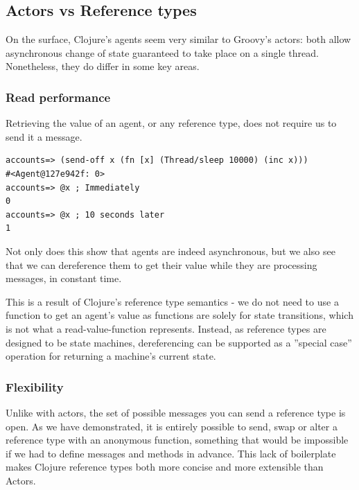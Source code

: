 \documentclass[a4paper,12pt]{kth-mag}
\begin{document}
\subsection{Actors vs Reference types}

On the surface, Clojure's agents seem very similar to Groovy's actors: both allow asynchronous change of state guaranteed to take place on a single thread. Nonetheless, they do differ in some key areas.

\subsubsection{Read performance}

Retrieving the value of an agent, or any reference type, does not require us to send it a message. 

\begin{listing}[H]
	\begin{verbatim}
accounts=> (send-off x (fn [x] (Thread/sleep 10000) (inc x)))
#<Agent@127e942f: 0>
accounts=> @x ; Immediately
0
accounts=> @x ; 10 seconds later
1
	\end{verbatim}
\end{listing}

Not only does this show that agents are indeed asynchronous, but we also see that we can dereference them to get their value while they are processing messages, in constant time.

This is a result of Clojure's reference type semantics - we do not need to use a function to get an agent's value as functions are solely for state transitions, which is not what a read-value-function represents. Instead, as reference types are designed to be state machines, dereferencing can be supported as a ''special case'' operation for returning a machine's current state.

\subsubsection{Flexibility}

Unlike with actors, the set of possible messages you can send a reference type is open. As we have demonstrated, it is entirely possible to send, swap or alter a reference type with an anonymous function, something that would be impossible if we had to define messages and methods in advance. This lack of boilerplate makes Clojure reference types both more concise and more extensible than Actors.
\end{document}
